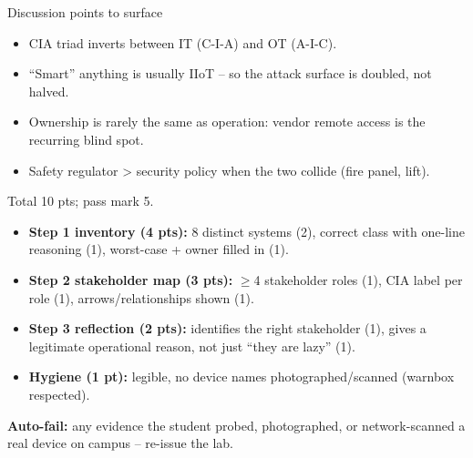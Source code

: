 \documentclass[11pt,a4paper]{article}
\begin{document}
\begin{solutionbox}{Discussion points to surface}
\begin{itemize}\setlength{\itemsep}{1pt}
  \item CIA triad inverts between IT (C-I-A) and OT (A-I-C).
  \item ``Smart'' anything is usually IIoT -- so the attack surface is doubled, not halved.
  \item Ownership is rarely the same as operation: vendor remote access is the recurring blind spot.
  \item Safety regulator > security policy when the two collide (fire panel, lift).
\end{itemize}
\end{solutionbox}

\begin{rubricbox}
Total 10 pts; pass mark 5.
\begin{itemize}\setlength{\itemsep}{1pt}
  \item \textbf{Step 1 inventory (4 pts):} 8 distinct systems (2), correct class with one-line reasoning (1), worst-case + owner filled in (1).
  \item \textbf{Step 2 stakeholder map (3 pts):} $\geq$4 stakeholder roles (1), CIA label per role (1), arrows/relationships shown (1).
  \item \textbf{Step 3 reflection (2 pts):} identifies the right stakeholder (1), gives a legitimate operational reason, not just ``they are lazy'' (1).
  \item \textbf{Hygiene (1 pt):} legible, no device names photographed/scanned (warnbox respected).
\end{itemize}
\textbf{Auto-fail:} any evidence the student probed, photographed, or
network-scanned a real device on campus -- re-issue the lab.
\end{rubricbox}
\end{document}
